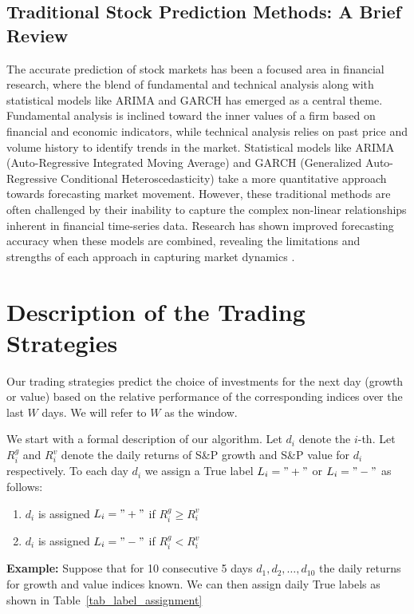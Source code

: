 \documentclass{article}
\begin{document}
\subsection{Traditional Stock Prediction Methods: A Brief Review}
The accurate prediction of stock markets has been a focused area in financial research, where the blend of fundamental and technical analysis along with statistical models like ARIMA and GARCH has emerged as a central theme. Fundamental analysis is inclined toward the inner values of a firm based on financial and economic indicators, while technical analysis relies on past price and volume history to identify trends in the market. Statistical models like ARIMA (Auto-Regressive Integrated Moving Average) and GARCH (Generalized Auto-Regressive Conditional Heteroscedasticity) take a more quantitative approach towards forecasting market movement. However, these traditional methods are often challenged by their inability to capture the complex non-linear relationships inherent in financial time-series data. Research has shown improved forecasting accuracy when these models are combined, revealing the limitations and strengths of each approach in capturing market dynamics \cite{saivijayalakshmi2021,johari2018}.


\section{Description of the Trading Strategies}

Our trading strategies predict the choice of investments for the next day (growth or value) based on the relative performance of the corresponding indices over the last $W$ days. We will refer to $W$ as the window. 

We start with a formal description of our algorithm. Let $d_{i}$ denote the $i$-th. Let $R_{i}^{g}$ and $R_{i}^{v}$ denote the daily returns of S{\&}P growth and S{\&}P value for $d_{i}$ respectively. To each day $d_{i}$ we assign a True label $L_{i}="+"$  or $L_{i}="-"$ as follows:
\begin{enumerate}
    \item $d_{i}$ is assigned $L_{i}="+"$ if $R_{i}^{g}\geq R_{i}^{v}$
    \item $d_{i}$ is assigned $L_{i}="-"$ if $R_{i}^{g}< R_{i}^{v}$
\end{enumerate}

\noindent
{\bf Example: } Suppose that for 10 consecutive 5 days 
$d_{1}, d_{2},\ldots, d_{10}$ the daily returns for growth and value indices known. We can then assign daily True labels as shown in Table~\ref{tab_label_assignment}
\end{document}
